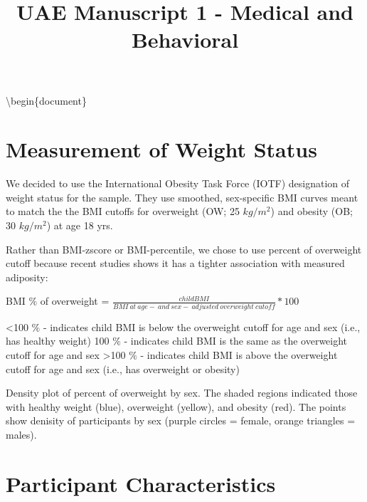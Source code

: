 \documentclass[
]{article}
\title{UAE Manuscript 1 - Medical and Behavioral}
\author{}
\date{\vspace{-2.5em}}
\begin{document}
\maketitle

{
\setcounter{tocdepth}{2}
\tableofcontents
}
\textbackslash begin\{document\}

\clearpage

\hypertarget{measurement-of-weight-status}{%
\section{Measurement of Weight
Status}\label{measurement-of-weight-status}}

We decided to use the International Obesity Task Force (IOTF)
designation of weight status for the sample. They use smoothed,
sex-specific BMI curves meant to match the the BMI cutoffs for
overweight (OW; 25 \(kg/m^2\)) and obesity (OB; 30 \(kg/m^2\)) at age 18
yrs.

Rather than BMI-zscore or BMI-percentile, we chose to use percent of
overweight cutoff because recent studies shows it has a tighter
association with measured adiposity:

BMI \(\%\) of overweight =
\(\frac{child BMI}{BMI\: at\: age-\: and\: sex-\: adjusted\: overweight\: cutoff}*100\)

\textless100 \(\%\) - indicates child BMI is below the overweight cutoff
for age and sex (i.e., has healthy weight) 100 \(\%\) - indicates child
BMI is the same as the overweight cutoff for age and sex \textgreater100
\(\%\) - indicates child BMI is above the overweight cutoff for age and
sex (i.e., has overweight or obesity)

\FloatBarrier

Density plot of percent of overweight by sex. The shaded regions
indicated those with healthy weight (blue), overweight (yellow), and
obesity (red). The points show denisity of participants by sex (purple
circles = female, orange triangles = males).

\FloatBarrier

\hypertarget{participant-characteristics}{%
\section{Participant
Characteristics}\label{participant-characteristics}}
\end{document}
